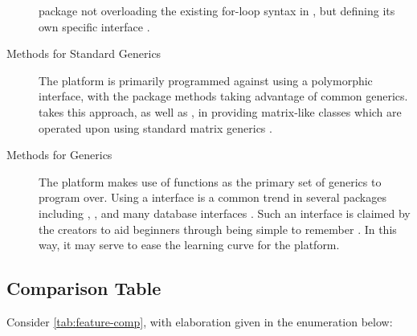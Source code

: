 \begin{description}
    package not overloading the existing for-loop syntax in \R, but defining
    its own specific interface \cite{microsoft20}.
  \item[Methods for Standard Generics]
    The platform is primarily programmed against using a polymorphic
    interface, with the package methods taking advantage of common generics.
     takes this approach, as well as , in providing
    matrix-like classes which are operated upon using standard matrix
    generics \cites{pbdDMATpackage,kane13:bigmemory}.
  \item[Methods for \pkg{dplyr} Generics]
    The platform makes use of  functions as the primary set of generics
    to program over. Using a  interface is a common trend in several \R
    packages including , , and many database interfaces
    \cites{luraschi20,zj20}. Such an interface is claimed by the 
    creators to aid beginners through being simple to remember
    \cite{wickham2019welcome}. In this way, it may serve to ease the
    learning curve for the platform.
\end{description}

\subsection{Comparison Table}\label{subsec:comp-tab}


Consider \cref{tab:feature-comp}, with elaboration given in the enumeration below:

